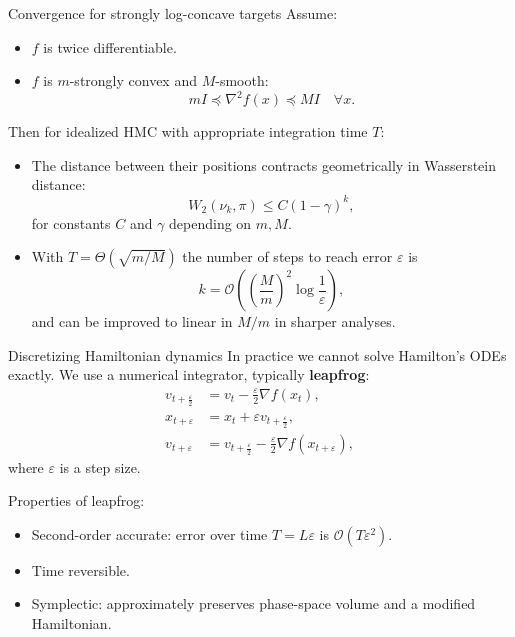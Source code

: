 \documentclass{beamer}
\begin{document}
\begin{frame}{Convergence for strongly log-concave targets}
  Assume:
  \begin{itemize}
    \item $f$ is twice differentiable.
    \item $f$ is $m$-strongly convex and $M$-smooth:
      \[
        mI \preceq \nabla^2 f(x) \preceq MI \quad \forall x.
      \]
  \end{itemize}
  Then for idealized HMC with appropriate integration time $T$:
  \begin{itemize}
    \item The distance between their positions contracts geometrically in
          Wasserstein distance:
      \[
        W_2(\nu_k, \pi) \le C (1-\gamma)^k,
      \]
      for constants $C$ and $\gamma$ depending on $m,M$.
    \item With $T = \Theta\!\left(\sqrt{m/M}\right)$ the number of steps
          to reach error $\varepsilon$ is
          \[
            k = \mathcal{O}\!\left(\left(\frac{M}{m}\right)^2 \log \frac{1}{\varepsilon}\right),
          \]
          and can be improved to linear in $M/m$ in sharper analyses.
  \end{itemize}
\end{frame}

\begin{frame}{Discretizing Hamiltonian dynamics}
  In practice we cannot solve Hamilton’s ODEs exactly.
  We use a numerical integrator, typically \textbf{leapfrog}:
  \[
  \begin{aligned}
    v_{t+\frac{\varepsilon}{2}} &= v_t - \frac{\varepsilon}{2}\nabla f(x_t), \\
    x_{t+\varepsilon} &= x_t + \varepsilon v_{t+\frac{\varepsilon}{2}}, \\
    v_{t+\varepsilon} &= v_{t+\frac{\varepsilon}{2}}
      - \frac{\varepsilon}{2}\nabla f(x_{t+\varepsilon}),
  \end{aligned}
  \]
  where $\varepsilon$ is a step size.

  \vspace{0.2cm}
  Properties of leapfrog:
  \begin{itemize}
    \item Second-order accurate: error over time $T = L\varepsilon$
          is $\mathcal{O}(T\varepsilon^2)$.
    \item Time reversible.
    \item Symplectic: approximately preserves phase-space volume and
          a modified Hamiltonian.
  \end{itemize}
\end{frame}
\end{document}
